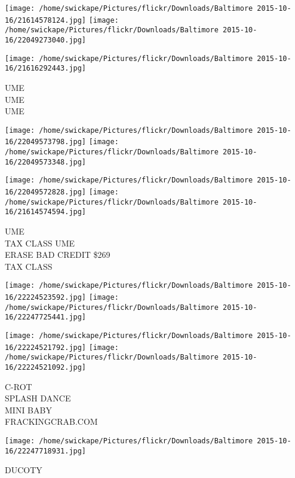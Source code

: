 \documentclass[10pt,letterpaper]{article}
\begin{document}
\texttt{[image: /home/swickape/Pictures/flickr/Downloads/Baltimore 2015-10-16/21614578124.jpg]}
\texttt{[image: /home/swickape/Pictures/flickr/Downloads/Baltimore 2015-10-16/22049273040.jpg]}

\vspace{0.25in}
\texttt{[image: /home/swickape/Pictures/flickr/Downloads/Baltimore 2015-10-16/21616292443.jpg]}

UME\\
UME\\
UME
\pagebreak

\texttt{[image: /home/swickape/Pictures/flickr/Downloads/Baltimore 2015-10-16/22049573798.jpg]}
\texttt{[image: /home/swickape/Pictures/flickr/Downloads/Baltimore 2015-10-16/22049573348.jpg]}

\texttt{[image: /home/swickape/Pictures/flickr/Downloads/Baltimore 2015-10-16/22049572828.jpg]}
\texttt{[image: /home/swickape/Pictures/flickr/Downloads/Baltimore 2015-10-16/21614574594.jpg]}

UME\\
TAX CLASS UME\\
ERASE BAD CREDIT \$269\\
TAX CLASS
\pagebreak

\texttt{[image: /home/swickape/Pictures/flickr/Downloads/Baltimore 2015-10-16/22224523592.jpg]}
\texttt{[image: /home/swickape/Pictures/flickr/Downloads/Baltimore 2015-10-16/22247725441.jpg]}

\texttt{[image: /home/swickape/Pictures/flickr/Downloads/Baltimore 2015-10-16/22224521792.jpg]}
\texttt{[image: /home/swickape/Pictures/flickr/Downloads/Baltimore 2015-10-16/22224521092.jpg]}

C{-}ROT\\
SPLASH DANCE\\
MINI BABY\\
FRACKINGCRAB.COM
\pagebreak

\texttt{[image: /home/swickape/Pictures/flickr/Downloads/Baltimore 2015-10-16/22247718931.jpg]}

DUCOTY
\pagebreak
\end{document}
